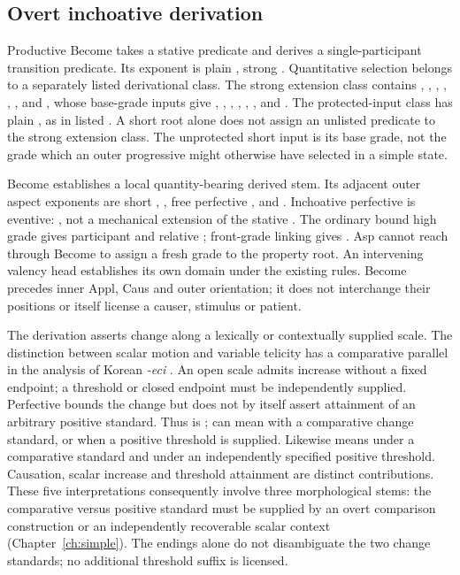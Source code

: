 \subsection{Overt inchoative derivation}\label{sec:stative-inchoative}

Productive Become takes a stative predicate and derives a single-participant
transition predicate. Its exponent is plain , strong .
Quantitative selection belongs to a separately listed derivational class.
The strong extension class contains , ,
, , , ,
 and , whose base-grade
inputs give , , ,
, , , 
and . The protected-input class has
plain , as in listed . A short root alone
does not assign an unlisted predicate to the strong extension class.
The unprotected short input is its base grade, not the grade which an outer
progressive might otherwise have selected in a simple state.

Become establishes a local quantity-bearing derived stem. Its adjacent outer
aspect exponents are short , , free perfective
,  and . Inchoative perfective is eventive:
, not a mechanical extension of the stative .
The ordinary bound high grade gives participant  and
relative ; front-grade linking gives .
Asp cannot reach through Become to assign a fresh grade to the property root.
An intervening valency head establishes its own domain under the existing
rules. Become precedes inner Appl, Caus and outer orientation; it does not
interchange their positions or itself license a causer, stimulus or patient.

The derivation asserts change along a lexically or contextually supplied
scale. The distinction between scalar motion and variable telicity has a
comparative parallel in the analysis of Korean \textit{-eci}
\cite{limzubizarreta2012}. An open scale admits increase without a fixed endpoint; a threshold or
closed endpoint must be independently supplied. Perfective bounds the change
but does not by itself assert attainment of an arbitrary positive standard.
Thus  is ;  can mean
 with a comparative change standard, or
 when a positive threshold is supplied. Likewise
 means  under a comparative standard and
 under an independently specified positive threshold.
Causation, scalar increase and threshold attainment are distinct contributions.
These five interpretations consequently involve three morphological stems:
the comparative versus positive standard must be supplied by an overt
comparison construction or an independently recoverable scalar context
(Chapter~\ref{ch:simple}). The endings alone do not disambiguate the two
change standards; no additional threshold suffix is licensed.


